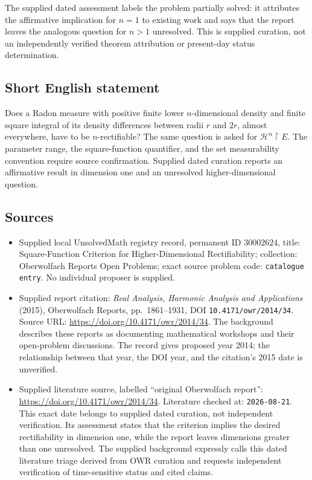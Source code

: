 \documentclass[11pt]{article}
\begin{document}
The supplied dated assessment labels the problem partially solved: it attributes the affirmative implication for \(n=1\) to existing work and says that the report leaves the analogous question for \(n>1\) unresolved. This is supplied curation, not an independently verified theorem attribution or present-day status determination.
\subsection{Short English statement}
Does a Radon measure with positive finite lower \(n\)-dimensional density and finite square integral of its density differences between radii \(r\) and \(2r\), almost everywhere, have to be \(n\)-rectifiable? The same question is asked for \(\mathcal H^n\!\restriction E\). The parameter range, the square-function quantifier, and the set measurability convention require source confirmation. Supplied dated curation reports an affirmative result in dimension one and an unresolved higher-dimensional question.
\subsection{Sources}
\begin{itemize}
\item Supplied local UnsolvedMath registry record, permanent ID \(30002624\), title: Square-Function Criterion for Higher-Dimensional Rectifiability; collection: Oberwolfach Reports Open Problems; exact source problem code: \texttt{catalogue entry}. No individual proposer is supplied.
\item Supplied report citation: \emph{Real Analysis, Harmonic Analysis and Applications} (2015), Oberwolfach Reports, pp.\ 1861--1931, DOI \texttt{10.4171/owr/2014/34}. Source URL: \url{https://doi.org/10.4171/owr/2014/34}. The background describes these reports as documenting mathematical workshops and their open-problem discussions. The record gives proposed year 2014; the relationship between that year, the DOI year, and the citation's 2015 date is unverified.
\item Supplied literature source, labelled ``original Oberwolfach report'': \url{https://doi.org/10.4171/owr/2014/34}. Literature checked at: \texttt{2026-08-21}. This exact date belongs to supplied dated curation, not independent verification. Its assessment states that the criterion implies the desired rectifiability in dimension one, while the report leaves dimensions greater than one unresolved. The supplied background expressly calls this dated literature triage derived from OWR curation and requests independent verification of time-sensitive status and cited claims.
\end{itemize}
\end{document}
